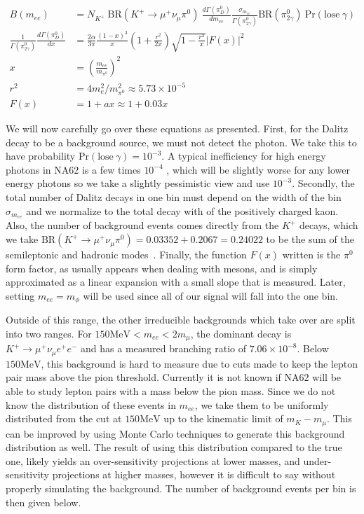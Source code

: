 \begin{align}
\label{eqn:kaon_dalitz_background}
B(m_{ee}) &= N_{K^+}~\textrm{BR}(K^+ \rightarrow \mu^+ \nu_\mu \pi^0)~\frac{d\Gamma(\pi^0_D)}{d m_{ee}} \frac{\sigma_{m_{ee}}}{\Gamma(\pi^0_{2\gamma})} \textrm{BR}(\pi^0_{2\gamma})~\textrm{Pr}(\textrm{lose}~\gamma) \\
\frac{1}{\Gamma(\pi^0_{2\gamma})} \frac{d\Gamma(\pi^0_D)}{dx} &= \frac{2\alpha}{3\pi} \frac{(1-x)^3}{x}(1+\frac{r^2}{2x})\sqrt{1-\frac{r^2}{x}}\left|F(x)\right|^2 \\
x &= \left(\frac{m_{ee}}{m_{\pi^0}}\right)^2 \\
r^2 &= 4 m_e^2 / m_{\pi^0}^2 \approx 5.73\times 10^{-5} \\
F(x) &= 1 + ax \approx 1+0.03x
\end{align}

We will now carefully go over these equations as presented.
First, for the Dalitz decay to be a background source, we must not detect the photon.
We take this to have probability $\textrm{Pr}(\textrm{lose}~\gamma) = 10^{-3}$.
A typical inefficiency for high energy photons in NA62 is a few times $10^{-4}$ \cite{Martellotti:2015kna}, which will be slightly worse for any lower energy photons so we take a slightly pessimistic view and use $10^{-3}$.
Secondly, the total number of Dalitz decays in one bin must depend on the width of the bin $\sigma_{m_{ee}}$ and we normalize to the total decay with of the positively charged kaon.
Also, the number of background events comes directly from the $K^+$ decays, which we take $\textrm{BR}(K^+ \rightarrow \mu^+ \nu_\mu \pi^0) = 0.03352 + 0.2067 = 0.24022$ to be the sum of the semileptonic and hadronic modes~\cite{Agashe:2014kda}.
Finally, the function $F(x)$ written is the $\pi^0$ form factor, as usually appears when dealing with mesons, and is simply approximated as a linear expansion with a small slope that is measured.
Later, setting $m_{ee} = m_\phi$ will be used since all of our signal will fall into the one bin.

Outside of this range, the other irreducible backgrounds which take over are split into two ranges.
For $150\textrm{MeV} < m_{ee} < 2m_\mu$, the dominant decay is $K^+ \rightarrow \mu^+ \nu_\mu e^+ e^-$ and has a measured branching ratio of $7.06 \times 10^{-8}$.
Below $150\textrm{MeV}$, this background is hard to measure due to cuts made to keep the lepton pair mass above the pion threshold.
Currently it is not known if NA62 will be able to study lepton pairs with a mass below the pion mass.
Since we do not know the distribution of these events in $m_{ee}$, we take them to be uniformly distributed from the cut at $150\textrm{MeV}$ up to the kinematic limit of $m_K - m_\mu$.
This can be improved by using Monte Carlo techniques to generate this background distribution as well.
The result of using this distribution compared to the true one, likely yields an over-sensitivity projections at lower masses, and under-sensitivity projections at higher masses, however it is difficult to say without properly simulating the background.
The number of background events per bin is then given below.

